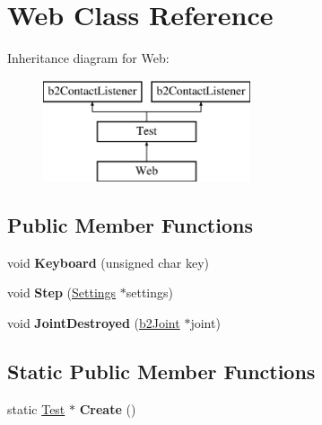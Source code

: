 \hypertarget{class_web}{\section{Web Class Reference}
\label{class_web}
}
Inheritance diagram for Web\-:\begin{figure}[H]
\begin{center}
\leavevmode
\includegraphics[height=3.000000cm]{class_web}
\end{center}
\end{figure}
\subsection*{Public Member Functions}
\begin{DoxyCompactItemize}
\item 
\hypertarget{class_web_a4f8ff48d46aaa7be40edf3872db89528}{void {\bfseries Keyboard} (unsigned char key)}\label{class_web_a4f8ff48d46aaa7be40edf3872db89528}

\item 
\hypertarget{class_web_a9d98fcd886c5f2d1f374b396d9c55582}{void {\bfseries Step} (\hyperlink{struct_settings}{Settings} $\ast$settings)}\label{class_web_a9d98fcd886c5f2d1f374b396d9c55582}

\item 
\hypertarget{class_web_a1ec86a2bf6e6818d65c05f7f7dc12db8}{void {\bfseries Joint\-Destroyed} (\hyperlink{classb2_joint}{b2\-Joint} $\ast$joint)}\label{class_web_a1ec86a2bf6e6818d65c05f7f7dc12db8}

\end{DoxyCompactItemize}
\subsection*{Static Public Member Functions}
\begin{DoxyCompactItemize}
\item 
\hypertarget{class_web_a111b83d3400f43512b3e56d186801666}{static \hyperlink{class_test}{Test} $\ast$ {\bfseries Create} ()}\label{class_web_a111b83d3400f43512b3e56d186801666}

\end{DoxyCompactItemize}
